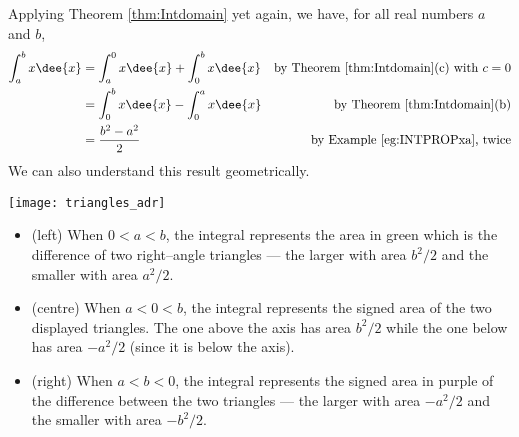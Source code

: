 \begin{eg}\label{eg:INTPROPx}
Applying Theorem \ref{thm:Intdomain} yet again, we have, for
all real numbers $a$ and $b$,
\begin{align*}
\int_a^b x\dee{x} &=  \int_a^0 x\dee{x} + \int_0^b x\dee{x} &
           \text{by Theorem \ref{thm:Intdomain}(c) with $c=0$}\\
               &=  \int_0^b x\dee{x} - \int_0^a x\dee{x} &
            \text{by Theorem \ref{thm:Intdomain}(b)}\\
               &=\frac{b^2-a^2}{2} &
            \text{by Example \ref{eg:INTPROPxa}, twice}
\end{align*}
We can also understand this result geometrically.
\begin{wfig}
 \begin{center}
  \texttt{[image: triangles\_adr]}
 \end{center}
\end{wfig}
\begin{itemize}
 \item (left) When $0<a<b$, the integral represents the area in green which
is the difference of two right--angle triangles --- the larger with area $b^2/2$
and the smaller with area $a^2/2$.
\item (centre) When $a<0<b$, the integral represents the signed area of the two
displayed triangles. The one above the axis has area $b^2/2$ while the one
below has area $-a^2/2$ (since it is below the axis).
\item (right) When $a<b<0$, the integral represents the signed area in purple
of the difference between the two triangles --- the larger with area $-a^2/2$
and the smaller with area $-b^2/2$.
\end{itemize}

\end{eg}


